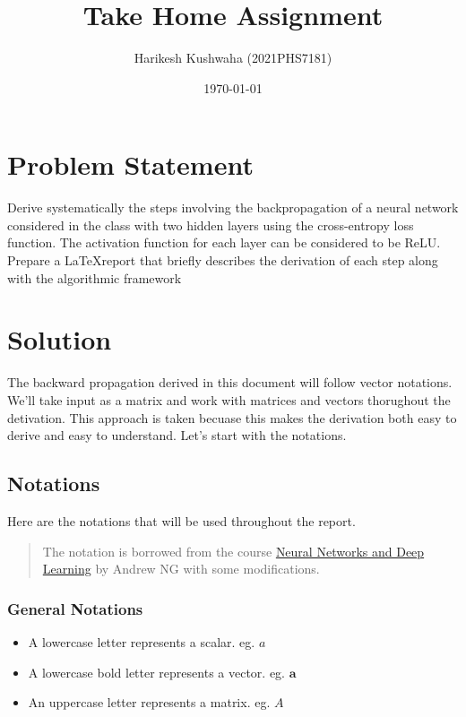 \documentclass[12pt]{article}
\title{Take Home Assignment}
\author{Harikesh Kushwaha (2021PHS7181)}
\date{\today}
\begin{document}
\maketitle
\tableofcontents
\newpage
\section{Problem Statement}
Derive systematically the steps involving the backpropagation of a neural network considered in the class with two hidden layers using the cross-entropy loss function. The activation function for each layer can be considered to be ReLU. Prepare a \LaTeX report that briefly describes the derivation of each step along with the algorithmic framework

\section{Solution}
The backward propagation derived in this document will follow vector notations. We'll take input as a matrix and work with matrices and vectors thorughout the detivation. This approach is taken becuase this makes the derivation both easy to derive and easy to understand. Let's start with the notations.

\subsection{Notations}
Here are the notations that will be used throughout the report.

\begin{quote}
    The notation is borrowed from the course
    \href{https://www.coursera.org/learn/neural-networks-deep-learning}{Neural
        Networks and Deep Learning} by Andrew NG with some modifications.
\end{quote}

\subsubsection{General Notations}
\begin{itemize}
    \item
          A lowercase letter represents a scalar. eg. \(a\)
    \item
          A lowercase bold letter represents a vector. eg. \(\mathbf{a}\)
    \item
          An uppercase letter represents a matrix. eg. \(A\)
\end{itemize}
\end{document}
